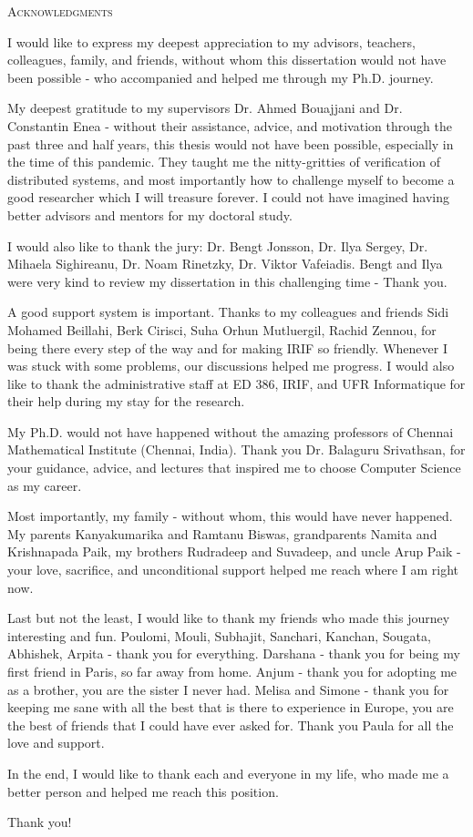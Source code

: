 \begin{center}
    \textsc{Acknowledgments}
  \end{center}
  \noindent

I would like to express my deepest appreciation to my advisors, teachers, colleagues, family, and friends, without whom this dissertation would not have been possible - who accompanied and helped me through my Ph.D. journey.

My deepest gratitude to my supervisors Dr. Ahmed Bouajjani and Dr. Constantin Enea - without their assistance, advice, and motivation through the past three and half years, this thesis would not have been possible, especially in the time of this pandemic. They taught me the nitty-gritties of verification of distributed systems, and most importantly how to challenge myself to become a good researcher which I will treasure forever. I could not have imagined having better advisors and mentors for my doctoral study.

I would also like to thank the jury: Dr. Bengt Jonsson, Dr. Ilya Sergey, Dr. Mihaela Sighireanu, Dr. Noam Rinetzky, Dr. Viktor Vafeiadis. Bengt and Ilya were very kind to review my dissertation in this challenging time - Thank you.

A good support system is important. Thanks to my colleagues and friends Sidi Mohamed Beillahi, Berk Cirisci, Suha Orhun Mutluergil, Rachid Zennou, for being there every step of the way and for making IRIF so friendly. Whenever I was stuck with some problems, our discussions helped me progress. I would also like to thank the administrative staff at ED 386, IRIF, and UFR Informatique for their help during my stay for the research.

My Ph.D. would not have happened without the amazing professors of Chennai Mathematical Institute (Chennai, India). Thank you Dr. Balaguru Srivathsan, for your guidance, advice, and lectures that inspired me to choose Computer Science as my career. 

Most importantly, my family - without whom, this would have never happened. My parents Kanyakumarika and Ramtanu Biswas, grandparents Namita and Krishnapada Paik, my brothers Rudradeep and Suvadeep, and uncle Arup Paik - your love, sacrifice, and unconditional support helped me reach where I am right now.

Last but not the least, I would like to thank my friends who made this journey interesting and fun. Poulomi, Mouli, Subhajit, Sanchari, Kanchan, Sougata, Abhishek, Arpita - thank you for everything. Darshana - thank you for being my first friend in Paris, so far away from home.  Anjum - thank you for adopting me as a brother, you are the sister I never had. Melisa and Simone - thank you for keeping me sane with all the best that is there to experience in Europe, you are the best of friends that I could have ever asked for. Thank you Paula for all the love and support.

In the end, I would like to thank each and everyone in my life, who made me a better person and helped me reach this position.

Thank you!